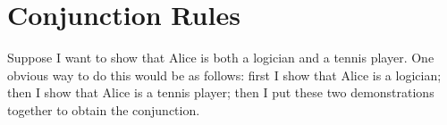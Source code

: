 %
%
%

\section{Conjunction Rules}
Suppose I want to show that Alice is both a logician and a tennis player. One obvious way to do this would be as follows: first I show that Alice is a logician; then I show that Alice is a tennis player; then I put these two demonstrations together to obtain the conjunction.


